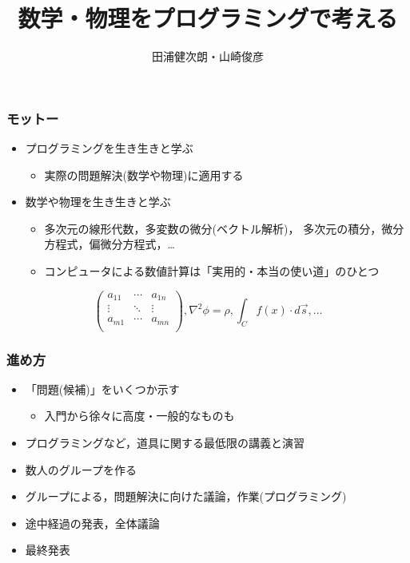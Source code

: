 \documentclass[12pt,dvipdfmx]{beamer}
\title{数学・物理をプログラミングで考える}
\institute{}
\author{田浦健次朗・山崎俊彦}
\date{}
\begin{document}
\maketitle

\begin{frame}
\frametitle{モットー}
\begin{itemize}
\item プログラミングを生き生きと学ぶ
  \begin{itemize}
  \item 実際の問題解決(数学や物理)に適用する
  \end{itemize}
\item 数学や物理を生き生きと学ぶ
  \begin{itemize}
  \item 多次元の線形代数，多変数の微分(ベクトル解析)，
    多次元の積分，微分方程式，偏微分方程式，\ldots
  \item コンピュータによる数値計算は「実用的・本当の使い道」のひとつ
  \end{itemize}
\end{itemize}

\[
\left(
\begin{array}{ccc}
a_{11}    & \cdots & a_{1n}    \\
\vdots   & \ddots & \vdots \\
a_{m1}    & \cdots & a_{mn}    \\
\end{array}
\right), 
\nabla^2 \phi = \rho, 
\int_C f(x) \cdot d\vec{s}, 
\ldots
\]
\end{frame}

\begin{frame}
\frametitle{進め方}
\begin{itemize}
\item 「問題(候補)」をいくつか示す
  \begin{itemize}
  \item 入門から徐々に高度・一般的なものも
  \end{itemize}
\item プログラミングなど，道具に関する最低限の講義と演習
\item 数人のグループを作る
\item グループによる，問題解決に向けた議論，作業(プログラミング)
\item 途中経過の発表，全体議論
\item 最終発表
\end{itemize}
\end{frame}
\end{document}
